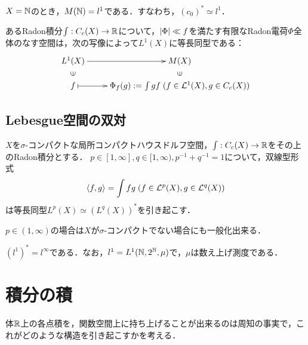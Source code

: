 \documentclass[uplatex,dvipdfmx]{jsreport}
\begin{document}
\begin{example}\label{exp-Riesz-Markov-theorem-to-sequence-spaces}
    $X=\mathbb{N}$のとき，$M(\mathbb{N})=l^1$である．すなわち，$(c_0)^*\simeq l^1$．
\end{example}

\begin{proposition}[絶対連続測度の表現]\label{prop-Riesz-4}
    あるRadon積分$\int:C_c(X)\to\mathbb{R}$について，$\lvert\Phi\rvert\ll f$を満たす有限なRadon電荷$\Phi$全体のなす空間は，次の写像によって$L^1(X)$に等長同型である：
    \[\xymatrix@R-2pc{
        L^1(X)\ar[r]&M(X)\\
        \rotatebox[origin=c]{90}{$\in$}&\rotatebox[origin=c]{90}{$\in$}\\
        f\ar@{|->}[r]&\Phi_f(g):=\int gf\;(f\in\L^1(X),g\in C_c(X))
    }\]
\end{proposition}

\subsection{Lebesgue空間の双対}

\begin{theorem}[双対]\label{thm-duality-of-Lp}
    $X$を$\sigma$-コンパクトな局所コンパクトハウスドルフ空間，$\int:C_c(X)\to\mathbb{R}$をその上のRadon積分とする．
    $p\in[1,\infty],q\in[1,\infty),p^{-1}+q^{-1}=1$について，双線型形式
    \[\langle f,g\rangle=\int fg\;(f\in\mathcal{L}^p(X),g\in\mathcal{L}^q(X))\]
    は等長同型$L^p(X)\simeq (L^q(X))^*$を引き起こす．
\end{theorem}
\begin{remark}
    $p\in(1,\infty)$の場合は$X$が$\sigma$-コンパクトでない場合にも一般化出来る．
\end{remark}

\begin{example}
    $(l^1)^*=l^\infty$である．なお，$l^1=L^1(\mathbb{N},2^{\mathbb{N}},\mu)$で，$\mu$は数え上げ測度である．
\end{example}

\section{積分の積}

\begin{tcolorbox}[colframe=ForestGreen, colback=ForestGreen!10!white,breakable,colbacktitle=ForestGreen!40!white,coltitle=black,fonttitle=\bfseries\sffamily,
title=]
    体$\mathbb{R}$上の各点積を，関数空間上に持ち上げることが出来るのは周知の事実で，これがどのような構造を引き起こすかを考える．
\end{tcolorbox}
\end{document}
